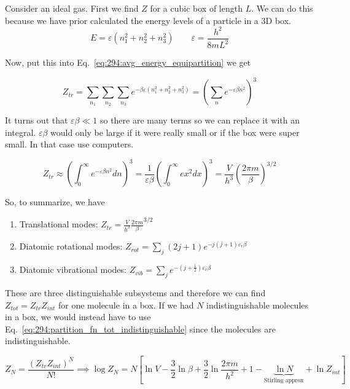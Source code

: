 \documentclass[10pt]{article}
\begin{document}
\begin{example}
	Consider an ideal gas. First we find $ Z $  for a cubic box of length $ L $.
	We can do this because we have prior calculated the energy levels of a particle in a 3D box.
	\begin{equation}
		E = \varepsilon (n_1^2 + n_2^2 + n_3^2) \qquad \varepsilon = \frac{h^2}{8mL^2}
	\end{equation}

	Now, put this into Eq.~\ref{eq:294:avg_energy_equipartition} we get

	\begin{equation}
		Z_{tr} = \sum_{n_1} \sum_{n_2} \sum_{n_3} e^{-\beta \varepsilon (n_1^2 + n_2^2 + n_3^2)}  = \left( \sum_{n} e^{-\varepsilon \beta n^2} \right)^3
	\end{equation}

	It turns out that $ \varepsilon \beta \ll 1 $  so there are many terms so we can replace it with an integral. $ \varepsilon \beta $ would only be large if it were really small or if the box were super small. In that case use computers.

	\begin{equation}
		Z_{tr} \approx \left( \int_0^\infty e^{-\varepsilon \beta n^2} dn \right) ^3 
	= \frac{1}{\varepsilon \beta} \left( \int_0^\infty e{x^2} dx \right) ^3 = \frac{V}{h^3} \left(\frac{2\pi m}{\beta}\right)^{3 /2}
	\end{equation}

	So, to summarize, we have

	\begin{enumerate}
		\item Translational modes: $ Z_{tr} = \frac{V}{h^3} \frac{2\pi m}{\beta}^{3 /2}  $ 
		\item Diatomic rotational modes: $Z_{rot} = \sum_j (2j+1) e^{-j(j+1) \varepsilon_r \beta}$
		\item Diatomic vibrational modes: $Z_{vib} =  \sum_j e^{-(j+ \frac{1}{2}) \varepsilon_v \beta}$ 
	\end{enumerate}

	These are three distinguishable subsystems and therefore we can find $ Z_{tot} = Z_{tr} Z_{int} $  for one molecule in a box.
	If we had $ N $  indistinguishable molecules in a box, we would instead have to use Eq.~\ref{eq:294:partition_fn_tot_indistinguishable} since the molecules are indistinguishable.

	\begin{equation}
		Z_N = \frac{ (Z_{tr} Z_{int})^N }{N!}  \implies \log{Z_N} =  N[\ln{V} - \frac{3}{2} \ln{\beta} + \frac{3}{2} \ln{\frac{2\pi m}{h^2}} + 1 - \underbrace{\ln{N}}_{\text{Stirling approx}} + \ln{Z_{int}} ]
	\end{equation}


\end{example}
\end{document}
